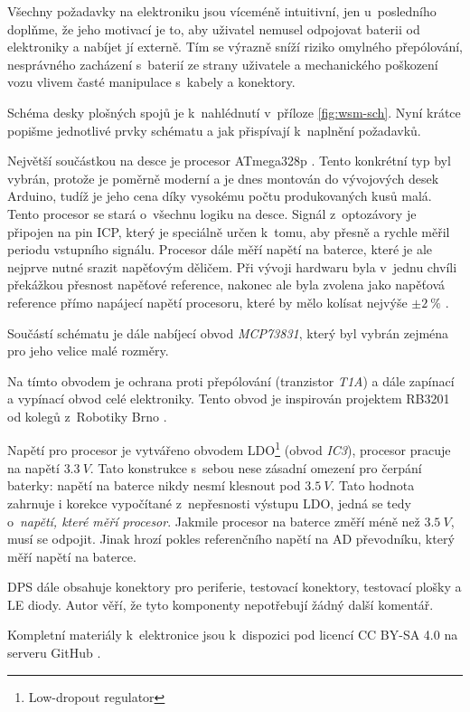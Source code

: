 Všechny požadavky na elektroniku jsou víceméně intuitivní, jen u~posledního
doplňme, že jeho motivací je to, aby uživatel nemusel odpojovat baterii od
elektroniky a nabíjet jí externě. Tím se výrazně sníží riziko omylného
přepólování, nesprávného zacházení s~baterií ze strany uživatele a mechanického
poškození vozu vlivem časté manipulace s~kabely a konektory.

Schéma desky plošných spojů je k~nahlédnutí v~příloze \ref{fig:wsm-sch}. Nyní
krátce popišme jednotlivé prvky schématu a jak přispívají k~naplnění požadavků.

Největší součástkou na desce je procesor ATmega328p \cite{atmega328p:datasheet}.
Tento konkrétní typ byl vybrán, protože je poměrně moderní a je dnes montován
do vývojových desek Arduino, tudíž je jeho cena díky vysokému počtu
produkovaných kusů malá.  Tento procesor se stará o~všechnu logiku na desce.
Signál z~optozávory je připojen na pin ICP, který je speciálně určen k~tomu,
aby přesně a rychle měřil periodu vstupního signálu. Procesor dále měří napětí
na baterce, které je ale nejprve nutné srazit napěťovým děličem. Při vývoji
hardwaru byla v~jednu chvíli překážkou přesnost napěťové reference, nakonec ale
byla zvolena jako napěťová reference přímo napájecí napětí procesoru, které by
mělo kolísat nejvýše $\pm 2\ \%$ \cite{ldo:datasheet}.

Součástí schématu je dále nabíjecí obvod \textit{MCP73831}, který byl vybrán
zejména pro jeho velice malé rozměry.

Na tímto obvodem je ochrana proti přepólování (tranzistor \textit{T1A}) a dále
zapínací a vypínací obvod celé elektroniky. Tento obvod je inspirován projektem
RB3201 \cite{rb3201} od kolegů z~Robotiky Brno \cite{roboticsbrno}.

Napětí pro procesor je vytvářeno obvodem LDO\footnote{Low-dropout regulator}
(obvod \textit{IC3}), procesor pracuje na napětí $3.3\ V$. Tato konstrukce
s~sebou nese zásadní omezení pro čerpání baterky: napětí na baterce nikdy nesmí
klesnout pod $3.5\ V$. Tato hodnota zahrnuje i korekce vypočítané z~nepřesnosti
výstupu LDO, jedná se tedy o~\textit{napětí, které měří procesor}. Jakmile
procesor na baterce změří méně než $3.5\ V$, musí se odpojit. Jinak hrozí
pokles referenčního napětí na AD převodníku, který měří napětí na baterce.

DPS dále obsahuje konektory pro periferie, testovací konektory, testovací
plošky a LE diody. Autor věří, že tyto komponenty nepotřebují žádný další
komentář.

Kompletní materiály k~elektronice jsou k~dispozici pod licencí CC BY-SA 4.0 na
serveru GitHub \cite{wsm-pcb}.

